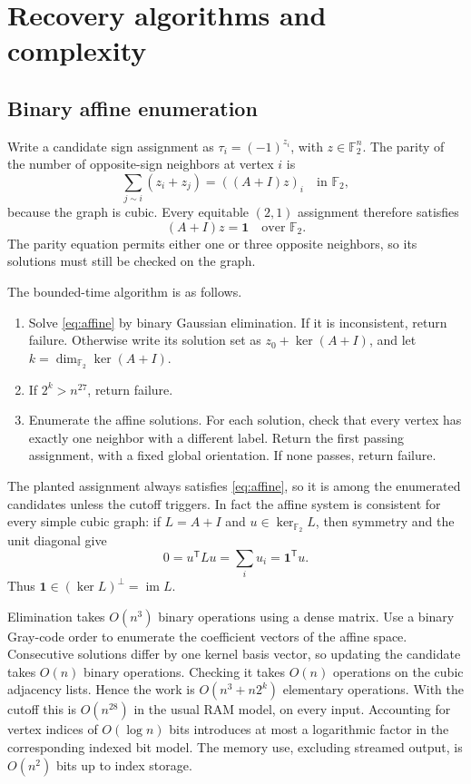\documentclass[11pt]{article}
\theoremstyle{remark}
\newcommand{\F}{\mathbb F}
\newcommand{\1}{\mathbf 1}
\DeclareMathOperator{\im}{im}
\begin{document}
\section{Recovery algorithms and complexity}

\subsection{Binary affine enumeration}

Write a candidate sign assignment as $\tau_i=(-1)^{z_i}$, with
$z\in\F_2^n$. The parity of the number of opposite-sign neighbors at
vertex $i$ is
\[
 \sum_{j\sim i}(z_i+z_j)=((A+I)z)_i\quad\text{in }\F_2,
\]
because the graph is cubic. Every equitable $(2,1)$ assignment therefore
satisfies
\begin{equation}\label{eq:affine}
 (A+I)z=\1\quad\text{over }\F_2.
\end{equation}
The parity equation permits either one or three opposite neighbors, so
its solutions must still be checked on the graph.

The bounded-time algorithm is as follows.
\begin{enumerate}
\item Solve \eqref{eq:affine} by binary Gaussian elimination. If it is
inconsistent, return failure. Otherwise write its solution set as
$z_0+\ker(A+I)$, and let $k=\dim_{\F_2}\ker(A+I)$.
\item If $2^k>n^{27}$, return failure.
\item Enumerate the affine solutions. For each solution, check that
every vertex has exactly one neighbor with a different label. Return
the first passing assignment, with a fixed global orientation.
If none passes, return failure.
\end{enumerate}

The planted assignment always satisfies \eqref{eq:affine}, so it is
among the enumerated candidates unless the cutoff triggers.
In fact the affine system is consistent for every simple cubic graph:
if $L=A+I$ and $u\in\ker_{\F_2}L$, then symmetry and the unit diagonal
give
\[
 0=u^{\mathsf T}Lu=\sum_i u_i=\1^{\mathsf T}u.
\]
Thus $\1\in(\ker L)^\perp=\im L$.

Elimination takes $O(n^3)$ binary operations using a dense matrix.
Use a binary Gray-code order to enumerate the coefficient vectors of
the affine space. Consecutive solutions differ by one kernel basis
vector, so updating the candidate takes $O(n)$ binary operations.
Checking it takes $O(n)$ operations on the cubic adjacency lists.
Hence the work is $O(n^3+n2^k)$ elementary operations. With the cutoff
this is $O(n^{28})$ in the usual RAM model, on every input. Accounting
for vertex indices of $O(\log n)$ bits introduces at most a logarithmic
factor in the corresponding indexed bit model. The memory use,
excluding streamed output, is $O(n^2)$ bits up to index storage.
\end{document}
